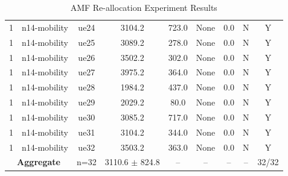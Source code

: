 \begin{table}[ht]
\begin{tabular}{|c|c|c|c|c|c|c|c|c|}
1 & n14-mobility & ue24 & 3104.2 & 723.0 & None & 0.0 & N & Y \\
1 & n14-mobility & ue25 & 3089.2 & 278.0 & None & 0.0 & N & Y \\
1 & n14-mobility & ue26 & 3502.2 & 302.0 & None & 0.0 & N & Y \\
1 & n14-mobility & ue27 & 3975.2 & 364.0 & None & 0.0 & N & Y \\
1 & n14-mobility & ue28 & 1984.2 & 437.0 & None & 0.0 & N & Y \\
1 & n14-mobility & ue29 & 2029.2 & 80.0 & None & 0.0 & N & Y \\
1 & n14-mobility & ue30 & 3085.2 & 717.0 & None & 0.0 & N & Y \\
1 & n14-mobility & ue31 & 3104.2 & 344.0 & None & 0.0 & N & Y \\
1 & n14-mobility & ue32 & 3503.2 & 363.0 & None & 0.0 & N & Y \\
\multicolumn{2}{|c|}{\textbf{Aggregate}} & n=32 & 3110.6 $\pm$ 824.8 & -- & -- & -- & -- & 32/32 \\
\hline
\end{tabular}
\caption{AMF Re-allocation Experiment Results}
\label{tab:amf_realloc}
\end{table}
